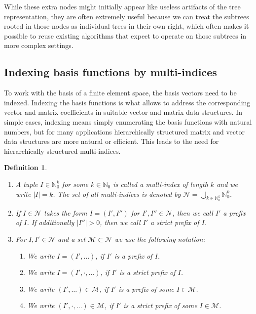 \documentclass[a4paper,10pt,headings=normal,bibliography=totoc]{scrartcl}
\newtheorem{definition}{Definition}
\newcommand{\N}{\mathbb{N}}
\begin{document}
While these extra nodes might initially appear like useless artifacts of the tree representation, they are often extremely useful
because we can treat the subtrees rooted in those nodes as individual trees in their own right, which often makes it possible to
reuse existing algorithms that expect to operate on those subtrees in more complex settings.




\subsection{Indexing basis functions by multi-indices}
\label{sec:index_trees}

To work with the basis of a finite element space, the basis vectors need to be indexed.  Indexing the basis functions
is what allows to address the corresponding vector and matrix coefficients in suitable vector and matrix data structures.
In simple cases, indexing means simply enumerating the basis functions with natural numbers, but for many applications
hierarchically structured matrix and vector data structures are more natural or efficient.  This leads to the need
for hierarchically structured multi-indices.

\begin{definition}
    \begin{enumerate}
        \item
            A tuple $I \in \N_0^k$ for some $k \in \N_0$ is called a multi-index of length $k$
            and we write $|I|=k$.
            The set of all multi-indices is denoted by
            $\mathcal{N} = \bigcup_{k \in \N_0^k} \N_0^k$.
        \item
            If $I \in \mathcal{N}$ takes the form $I = (I',I'')$ for $I',I'' \in \mathcal{N}$,
            then we call $I'$ a prefix of $I$.
            If additionally $|I''|>0$, then we call $I'$ a strict prefix of $I$.
        \item
            For $I,I' \in \mathcal{N}$ and a set $\mathcal{M} \subset \mathcal{N}$
            we use the following notation:
            \begin{enumerate}
              \item
                We write $I=(I',\dots)$, if $I'$ is a prefix of $I$.
              \item
                We write $I=(I',\cdot,\dots)$, if $I'$ is a strict prefix of $I$.
              \item
                We write $(I',\dots) \in \mathcal{M}$, if $I'$ is a prefix of some
                $I \in \mathcal{M}$.
              \item
                We write $(I',\cdot,\dots) \in \mathcal{M}$, if $I'$ is a strict prefix of some
                $I \in \mathcal{M}$.
            \end{enumerate}
    \end{enumerate}
\end{definition}
\end{document}
